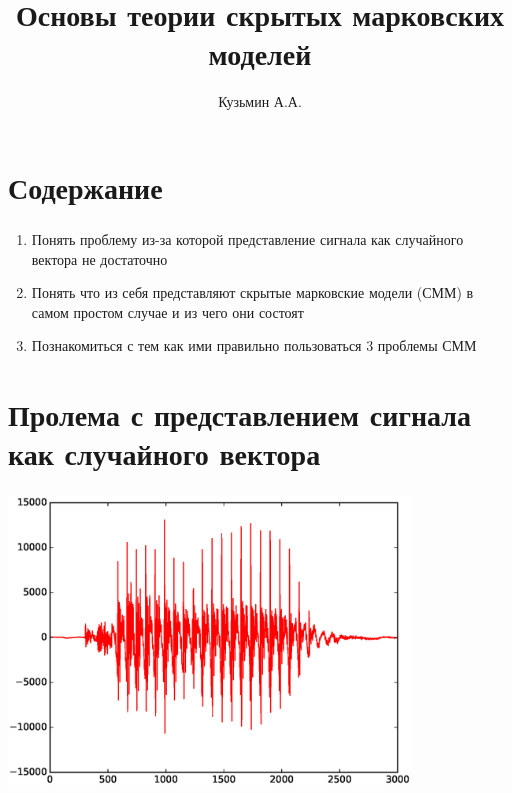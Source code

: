 \documentclass{beamer}
\title{Основы теории скрытых марковских моделей}
\author{Кузьмин А.А.}
\institute[]{\url{http://rfe.bsu.by/}}
\begin{document}
\begin{frame}
  \maketitle
\end{frame}

\section{Содержание}

\begin{frame} \label{cont}
  \frametitle{\insertsection}
  \begin{enumerate}
    \item Понять проблему из-за которой представление сигнала как случайного вектора не достаточно \pause
    \item Понять что из себя представляют \alert{скрытые марковские модели (СММ)} в самом простом случае и из чего они состоят\pause
    \item Познакомиться с тем как ими правильно пользоваться \pause
      $3$ проблемы СММ
  \end{enumerate}
\end{frame}

\section{Пролема с представлением сигнала как случайного вектора}
\begin{frame}
  \frametitle{\insertsection}
  \includegraphics[width=0.8\textwidth]{a_short.eps}
\end{frame}
\end{document}
